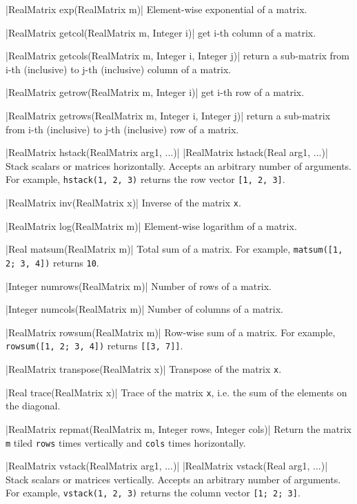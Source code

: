 \blog|RealMatrix exp(RealMatrix m)|
\myindent Element-wise exponential of a matrix.

\blog|RealMatrix getcol(RealMatrix m, Integer i)|
\myindent get i-th column of a matrix.

\blog|RealMatrix getcols(RealMatrix m, Integer i, Integer j)|
\myindent return a sub-matrix from i-th (inclusive) to j-th (inclusive) column of a matrix.

\blog|RealMatrix getrow(RealMatrix m, Integer i)|
\myindent get i-th row of a matrix.

\blog|RealMatrix getrows(RealMatrix m, Integer i, Integer j)|
\myindent return a sub-matrix from i-th (inclusive) to j-th (inclusive) row of a matrix.

\blog|RealMatrix hstack(RealMatrix arg1, ...)|
\blog|RealMatrix hstack(Real arg1, ...)|
\myindent Stack scalars or matrices horizontally. Accepts an arbitrary number
of arguments.
For example, \verb|hstack(1, 2, 3)| returns the row vector {\tt [1, 2, 3]}.

\blog|RealMatrix inv(RealMatrix x)|
\myindent Inverse of the matrix \verb|x|.

\blog|RealMatrix log(RealMatrix m)|
\myindent Element-wise logarithm of a matrix.

\blog|Real matsum(RealMatrix m)|
\myindent Total sum of a matrix.
For example, \verb|matsum([1, 2; 3, 4])| returns \verb|10|.

\blog|Integer numrows(RealMatrix m)|
\myindent Number of rows of a matrix.

\blog|Integer numcols(RealMatrix m)|
\myindent Number of columns of a matrix.

\blog|RealMatrix rowsum(RealMatrix m)|
\myindent Row-wise sum of a matrix.
For example, \verb|rowsum([1, 2; 3, 4])| returns \verb|[[3, 7]]|.

\blog|RealMatrix transpose(RealMatrix x)|
\myindent Transpose of the matrix \verb|x|.

\blog|Real trace(RealMatrix x)|
\myindent Trace of the matrix \verb|x|, i.e. the sum of the elements on the diagonal.

\blog|RealMatrix repmat(RealMatrix m, Integer rows, Integer cols)|
\myindent Return the matrix \verb|m| tiled \verb|rows| times vertically and
\verb|cols|
times horizontally.

\blog|RealMatrix vstack(RealMatrix arg1, ...)|
\blog|RealMatrix vstack(Real arg1, ...)|
\myindent Stack scalars or matrices vertically. Accepts an arbitrary number of
arguments.
For example, \verb|vstack(1, 2, 3)| returns the column vector {\tt [1; 2; 3]}.


